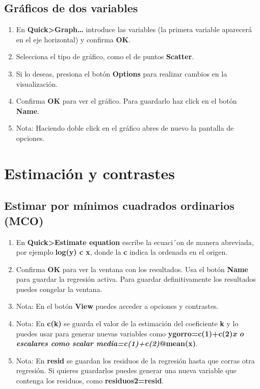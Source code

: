 \documentclass[
]{book}
\providecommand{\tightlist}{%
  \setlength{\itemsep}{0pt}\setlength{\parskip}{0pt}}
\begin{document}
\hypertarget{gruxe1ficos-de-dos-variables}{%
\subsection{Gráficos de dos variables}\label{gruxe1ficos-de-dos-variables}}

\begin{enumerate}
\def\labelenumi{\arabic{enumi}.}
\tightlist
\item
  En \textbf{Quick\textgreater Graph\ldots{}} introduce las variables (la primera variable aparecerá en el eje horizontal) y confirma \textbf{OK}.
\item
  Selecciona el tipo de gráfico, como el de puntos \textbf{Scatter}.
\item
  Si lo deseas, presiona el botón \textbf{Options} para realizar cambios en la visualización.
\item
  Confirma \textbf{OK} para ver el gráfico. Para guardarlo haz click en el botón \textbf{Name}.
\item
  Nota: Haciendo doble click en el gráfico abres de nuevo la pantalla de opciones.
\end{enumerate}

\hypertarget{estimaciuxf3n-y-contrastes}{%
\section{Estimación y contrastes}\label{estimaciuxf3n-y-contrastes}}

\hypertarget{estimar-por-muxednimos-cuadrados-ordinarios-mco}{%
\subsection{Estimar por mínimos cuadrados ordinarios (MCO)}\label{estimar-por-muxednimos-cuadrados-ordinarios-mco}}

\begin{enumerate}
\def\labelenumi{\arabic{enumi}.}
\tightlist
\item
  En \textbf{Quick\textgreater Estimate equation} escribe la ecuaci´on de manera abreviada, por ejemplo \textbf{log(y) c x}, donde la \textbf{c} indica la ordenada en el origen.
\item
  Confirma \textbf{OK} para ver la ventana con los resultados. Usa el botón \textbf{Name} para guardar la regresión activa. Para guardar definitivamente los resultados puedes congelar la ventana.
\item
  Nota: En el botón \textbf{View} puedes acceder a opciones y contrastes.
\item
  Nota: En \textbf{c(k)} se guarda el valor de la estimación del coeficiente \textbf{k} y lo puedes usar para generar nuevas variables como \textbf{ygorro=c(1)+c(2)\emph{x\textbf{ o escalares como }scalar media=c(1)+c(2)}@mean(x)}.
\item
  Nota: En \textbf{resid} se guardan los residuos de la regresión hasta que corras otra regresión. Si quieres guardarlos puedes generar una nueva variable que contenga los residuos, como \textbf{residuos2=resid}.
\end{enumerate}
\end{document}
